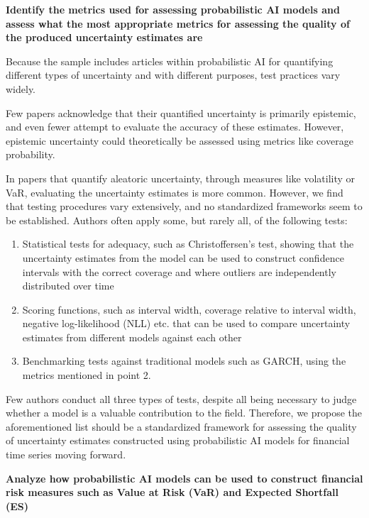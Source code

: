 \textbf{Identify the metrics used for assessing probabilistic AI models and assess what the most appropriate metrics for assessing the quality of the produced uncertainty estimates are}\nopagebreak

Because the sample includes articles within probabilistic AI for quantifying different types of uncertainty and with different purposes, test practices vary widely.

Few papers acknowledge that their quantified uncertainty is primarily epistemic, and even fewer attempt to evaluate the accuracy of these estimates. However, epistemic uncertainty could theoretically be assessed using metrics like coverage probability.

In papers that quantify aleatoric uncertainty, through measures like volatility or VaR, evaluating the uncertainty estimates is more common. However, we find that testing procedures vary extensively, and no standardized frameworks seem to be established. Authors often apply some, but rarely all, of the following tests:

\begin{enumerate}
    \item Statistical tests for adequacy, such as Christoffersen's test, showing that the uncertainty estimates from the model can be used to construct confidence intervals with the correct coverage and where outliers are independently distributed over time
    \item Scoring functions, such as interval width, coverage relative to interval width, negative log-likelihood (NLL) etc. that can be used to compare uncertainty estimates from different models against each other
    \item Benchmarking tests against traditional models such as GARCH, using the metrics mentioned in point 2.
\end{enumerate}

Few authors conduct all three types of tests, despite all being necessary to judge whether a model is a valuable contribution to the field. Therefore, we propose the aforementioned list should be a standardized framework for assessing the quality of uncertainty estimates constructed using probabilistic AI models for financial time series moving forward. 

\textbf{Analyze how probabilistic AI models can be used to construct financial risk measures such as Value at Risk (VaR) and Expected Shortfall (ES)}\nopagebreak

